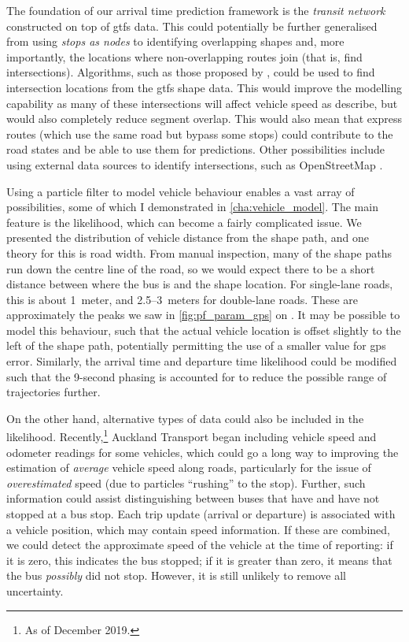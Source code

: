 The foundation of our arrival time prediction framework is the \emph{transit network} constructed on top of \gls{gtfs} data. This could potentially be further generalised from using \emph{stops as nodes} to identifying overlapping shapes and, more importantly, the locations where non-overlapping routes join (that is, find intersections). Algorithms, such as those proposed by \citet{Xie_2016,Zhang_2017}, could be used to find intersection locations from the \gls{gtfs} shape data. This would improve the modelling capability as many of these intersections will affect vehicle speed as \citet{Celan_2017} describe, but would also completely reduce segment overlap. This would also mean that express routes (which use the same road but bypass some stops) could contribute to the road states and be able to use them for predictions. Other possibilities include using external data sources to identify intersections, such as OpenStreetMap \citep{OpenStreetMap_2017}.


Using a particle filter to model vehicle behaviour enables a vast array of possibilities, some of which I demonstrated in \cref{cha:vehicle_model}. The main feature is the likelihood, which can become a fairly complicated issue. We presented the distribution of vehicle distance from the shape path, and one theory for this is road width. From manual inspection, many of the shape paths run down the centre line of the road, so we would expect there to be a short distance between where the bus is and the shape location. For single-lane roads, this is about 1~meter, and 2.5--3~meters for double-lane roads. These are approximately the peaks we saw in \cref{fig:pf_param_gps} on . It may be possible to model this behaviour, such that the actual vehicle location is offset slightly to the left of the shape path, potentially permitting the use of a smaller value for \gls{gps} error. Similarly, the arrival time and departure time likelihood could be modified such that the 9-second phasing is accounted for to reduce the possible range of trajectories further.


On the other hand, alternative types of data could also be included in the likelihood. Recently,\footnote{As of December 2019.} Auckland Transport began including vehicle speed and odometer readings for some vehicles, which could go a long way to improving the estimation of \emph{average} vehicle speed along roads, particularly for the issue of \emph{overestimated} speed (due to particles ``rushing'' to the stop). Further, such information could assist distinguishing between buses that have and have not stopped at a bus stop. Each trip update (arrival or departure) is associated with a vehicle position, which may contain speed information. If these are combined, we could detect the approximate speed of the vehicle at the time of reporting: if it is zero, this indicates the bus stopped; if it is greater than zero, it means that the bus \emph{possibly} did not stop. However, it is still unlikely to remove all uncertainty.


